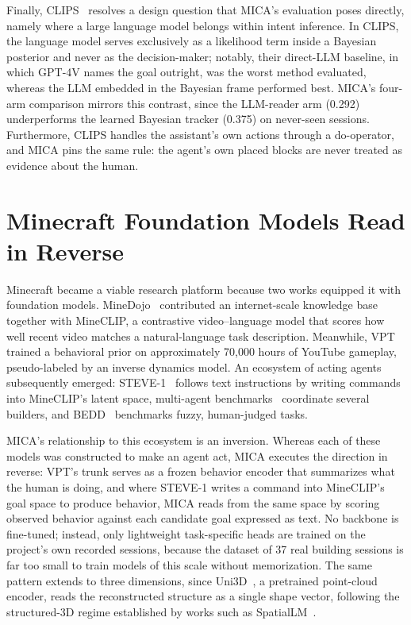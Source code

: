 \documentclass[12pt]{article}
\begin{document}
Finally, CLIPS~\cite{clips} resolves a design question that MICA's evaluation
poses directly, namely where a large language model belongs within intent
inference. In CLIPS, the language model serves exclusively as a likelihood term
inside a Bayesian posterior and never as the decision-maker; notably, their
direct-LLM baseline, in which GPT-4V names the goal outright, was the worst
method evaluated, whereas the LLM embedded in the Bayesian frame performed best.
MICA's four-arm comparison mirrors this contrast, since the LLM-reader arm
(0.292) underperforms the learned Bayesian tracker (0.375) on never-seen
sessions. Furthermore, CLIPS handles the assistant's own actions through a
do-operator, and MICA pins the same rule: the agent's own placed blocks are
never treated as evidence about the human.

\section{Minecraft Foundation Models Read in Reverse}

Minecraft became a viable research platform because two works equipped it with
foundation models. MineDojo~\cite{minedojo} contributed an internet-scale
knowledge base together with MineCLIP, a contrastive video--language model that
scores how well recent video matches a natural-language task description.
Meanwhile, VPT~\cite{vpt} trained a behavioral prior on approximately 70{,}000
hours of YouTube gameplay, pseudo-labeled by an inverse dynamics model. An
ecosystem of acting agents subsequently emerged: STEVE-1~\cite{steve1} follows
text instructions by writing commands into MineCLIP's latent space, multi-agent
benchmarks~\cite{teamcraft,villageragent,mbag} coordinate several builders, and
BEDD~\cite{bedd} benchmarks fuzzy, human-judged tasks.

MICA's relationship to this ecosystem is an inversion. Whereas each of these
models was constructed to make an agent act, MICA executes the direction in
reverse: VPT's trunk serves as a frozen behavior encoder that summarizes what
the human is doing, and where STEVE-1 writes a command into MineCLIP's goal
space to produce behavior, MICA reads from the same space by scoring observed
behavior against each candidate goal expressed as text. No backbone is
fine-tuned; instead, only lightweight task-specific heads are trained on the
project's own recorded sessions, because the dataset of 37 real building
sessions is far too small to train models of this scale without memorization.
The same pattern extends to three dimensions, since Uni3D~\cite{uni3d}, a
pretrained point-cloud encoder, reads the reconstructed structure as a single
shape vector, following the structured-3D regime established by works such as
SpatialLM~\cite{spatiallm}.
\end{document}
